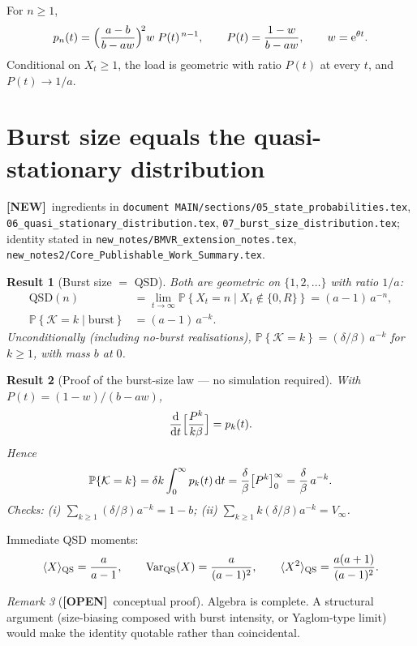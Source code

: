 \documentclass[11pt,a4paper]{article}
\newcommand{\dd}{{\rm d}}
\newcommand{\ee}{{\rm e}}
\newcommand{\Prob}[1]{\mathbb{P}\!\left\{#1\right\}}
\newcommand{\xt}{X_t}
\newcommand{\Kb}{\mathcal{K}}
\theoremstyle{plain}
\newtheorem{result}{Result}[section]
\theoremstyle{definition}
\theoremstyle{remark}
\newtheorem{remark}[result]{Remark}
\newcommand{\NEW}{\textcolor{blue!55!black}{\textbf{[NEW]}}}
\newcommand{\OPEN}{\textcolor{red!55!black}{\textbf{[OPEN]}}}
\begin{document}
For $n\ge 1$,
\begin{equation}
\label{eq:pn}
p_n(t)=\Bigl(\frac{a-b}{b-aw}\Bigr)^{\!2}w\;P(t)^{\,n-1},
\qquad P(t)=\frac{1-w}{b-aw},\qquad w=\ee^{\theta t}.
\end{equation}
Conditional on $\xt\ge 1$, the load is geometric with ratio $P(t)$ at every $t$,
and $P(t)\to 1/a$.

\section{Burst size equals the quasi-stationary distribution}
\label{sec:qsd}
\NEW\ ingredients in
\texttt{document MAIN/sections/05\_state\_probabilities.tex},
\texttt{06\_quasi\_stationary\_distribution.tex},
\texttt{07\_burst\_size\_distribution.tex};
identity stated in
\texttt{new\_notes/BMVR\_extension\_notes.tex},
\texttt{new\_notes2/Core\_Publishable\_Work\_Summary.tex}.

\begin{result}[Burst size $=$ QSD]
Both are geometric on $\{1,2,\ldots\}$ with ratio $1/a$:
\begin{align}
\mathrm{QSD}(n)
&=\lim_{t\to\infty}\Prob{\xt=n\mid \xt\notin\{0,R\}}
=(a-1)\,a^{-n},\\
\Prob{\Kb=k\mid\text{burst}}
&=(a-1)\,a^{-k}.
\end{align}
Unconditionally (including no-burst realisations),
$\Prob{\Kb=k}=(\delta/\beta)\,a^{-k}$ for $k\ge 1$, with mass $b$ at $0$.
\end{result}

\begin{result}[Proof of the burst-size law --- no simulation required]
With $P(t)=(1-w)/(b-aw)$,
\[
\frac{\dd}{\dd t}\Bigl[\frac{P^k}{k\beta}\Bigr]=p_k(t).
\]
Hence
\[
\Prob{\Kb=k}
=\delta k\int_0^\infty p_k(t)\,\dd t
=\frac{\delta}{\beta}\bigl[P^k\bigr]_0^\infty
=\frac{\delta}{\beta}\,a^{-k}.
\]
Checks: (i) $\sum_{k\ge 1}(\delta/\beta)a^{-k}=1-b$;
(ii) $\sum_{k\ge 1}k(\delta/\beta)a^{-k}=V_\infty$.
\end{result}

Immediate QSD moments:
\begin{equation}
\langle X\rangle_{\rm QS}=\frac{a}{a-1},\qquad
\mathrm{Var}_{\rm QS}(X)=\frac{a}{(a-1)^2},\qquad
\langle X^2\rangle_{\rm QS}=\frac{a(a+1)}{(a-1)^2}.
\end{equation}

\begin{remark}[\OPEN\ conceptual proof]
Algebra is complete. A structural argument (size-biasing composed with burst
intensity, or Yaglom-type limit) would make the identity quotable rather than
coincidental.
\end{remark}
\end{document}
